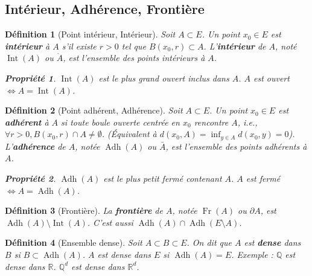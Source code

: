 \documentclass[a4paper]{article}
\newcommand{\R}{\mathbb{R}}
\newcommand{\Q}{\mathbb{Q}}
\newtheorem{definition}{Définition}[section]
\newtheorem{propriete}{Propriété}[section] %
\begin{document}
\subsection{Intérieur, Adhérence, Frontière}
\begin{definition}[Point intérieur, Intérieur]
    Soit \(A \subset E\). Un point \(x_0 \in E\) est \textbf{intérieur} à \(A\) s'il existe \(r > 0\) tel que \(B(x_0, r) \subset A\).
    L'\textbf{intérieur} de \(A\), noté \(\operatorname{Int}(A)\) ou \(\mathring{A}\), est l'ensemble des points intérieurs à \(A\).
    \begin{propriete}
        \(\operatorname{Int}(A)\) est le plus grand ouvert inclus dans \(A\). \(A\) est ouvert \(\iff A = \operatorname{Int}(A)\).
    \end{propriete}
\end{definition}
\begin{definition}[Point adhérent, Adhérence]
    Soit \(A \subset E\). Un point \(x_0 \in E\) est \textbf{adhérent} à \(A\) si toute boule ouverte centrée en \(x_0\) rencontre \(A\), i.e., \(\forall r > 0, B(x_0, r) \cap A \neq \emptyset\). (Équivalent à \(d(x_0, A) = \inf_{y \in A} d(x_0,y) = 0\)).
    L'\textbf{adhérence} de \(A\), notée \(\operatorname{Adh}(A)\) ou \(\bar{A}\), est l'ensemble des points adhérents à \(A\).
    \begin{propriete}
        \(\operatorname{Adh}(A)\) est le plus petit fermé contenant \(A\). \(A\) est fermé \(\iff A = \operatorname{Adh}(A)\).
    \end{propriete}
\end{definition}
\begin{definition}[Frontière]
    La \textbf{frontière} de \(A\), notée \(\operatorname{Fr}(A)\) ou \(\partial A\), est \(\operatorname{Adh}(A) \setminus \operatorname{Int}(A)\).
    C'est aussi \(\operatorname{Adh}(A) \cap \operatorname{Adh}(E \setminus A)\).
\end{definition}
\begin{definition}[Ensemble dense]
    Soit \(A \subset B \subset E\). On dit que \(A\) est \textbf{dense} dans \(B\) si \(B \subset \operatorname{Adh}(A)\).
    \(A\) est dense dans \(E\) si \(\operatorname{Adh}(A) = E\).
    Exemple : \(\Q\) est dense dans \(\R\). \(\Q^d\) est dense dans \(\R^d\).
\end{definition}
\end{document}
